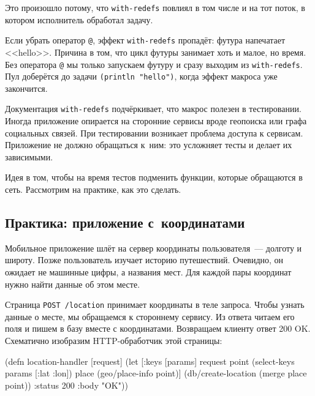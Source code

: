 \fi

Это произошло потому, что \verb|with-redefs| повлиял в том числе и на тот
поток, в котором исполнитель обработал задачу.

Если убрать оператор \verb|@|, эффект \verb|with-redefs| пропадёт: футура
напечатает <<hello>>. Причина в том, что цикл футуры занимает хоть и малое, но
время. Без оператора \verb|@| мы только запускаем футуру и сразу выходим из
\verb|with-redefs|. Пул доберётся до задачи \verb|(println "hello")|, когда
эффект макроса уже закончится.

Документация \verb|with-redefs| подчёркивает, что макрос полезен в
тестировании. Иногда приложение опирается на сторонние сервисы вроде геопоиска
или графа социальных связей. При тестировании возникает проблема доступа к
сервисам. Приложение не должно обращаться к~ним: это усложняет тесты и делает их
зависимыми.

Идея в том, чтобы на время тестов подменить функции, которые обращаются в
сеть. Рассмотрим на практике, как это сделать.

\subsection{Практика: приложение с~координатами}


Мобильное приложение шлёт на сервер координаты пользователя~--- долготу и
широту. Позже пользователь изучает историю путешествий. Очевидно, он ожидает не
машинные цифры, а названия мест. Для каждой пары координат нужно найти данные об
этом месте.

Страница \verb|POST /location| принимает координаты в теле запроса. Чтобы узнать
данные о месте, мы обращаемся к стороннему сервису. Из ответа читаем его поля и
пишем в базу вместе с координатами. Возвращаем клиенту ответ 200 OK. Схематично
изобразим HTTP-обработчик этой страницы:

\ifnarrow

\begin{english}
  \begin{clojure}
(defn location-handler [request]
  (let [{:keys [params]} request
        point (select-keys params
                [:lat :lon])
        place (geo/place-info point)]
    (db/create-location
      (merge place point))
    {:status 200 :body "OK"}))
  \end{clojure}
\end{english}

